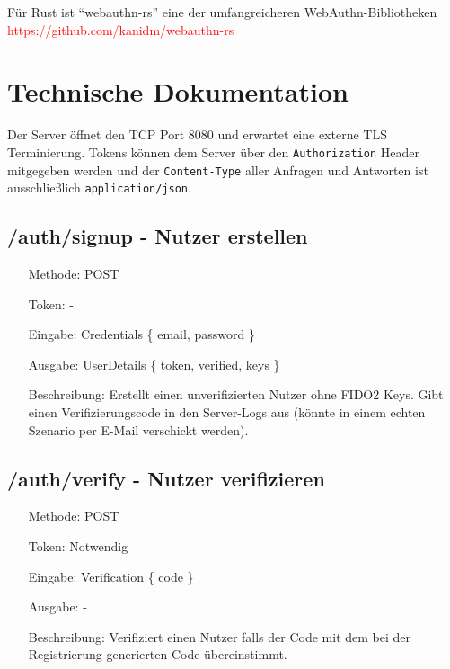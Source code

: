 \documentclass[journal]{IEEEtran}
\begin{document}
Für Rust ist ``webauthn-rs'' eine der umfangreicheren WebAuthn-Bibliotheken 
\textcolor{red}{https://github.com/kanidm/webauthn-rs}

\section{Technische Dokumentation}

Der Server öffnet den TCP Port 8080 und erwartet eine externe TLS
Terminierung. Tokens können dem Server über den \texttt{Authorization} Header
mitgegeben werden und der \texttt{Content-Type} aller Anfragen und Antworten
ist ausschließlich \texttt{application/json}.

\subsection{/auth/signup - Nutzer erstellen}

\begin{itemize}
	\setlength{\leftskip}{1.5cm}
	\setlength{\itemsep}{0pt}
	\item[Methode:] POST
	\item[Token:] -
	\item[Eingabe:] Credentials \{ email, password \}
	\item[Ausgabe:] UserDetails \{ token, verified, keys \}
	\item[Beschreibung:] Erstellt einen unverifizierten Nutzer ohne FIDO2 Keys.
		Gibt einen Verifizierungscode in den Server-Logs aus (könnte in einem
		echten Szenario per E-Mail verschickt werden).
\end{itemize}

\subsection{/auth/verify - Nutzer verifizieren}

\begin{itemize}
	\setlength{\leftskip}{1.5cm}
	\setlength{\itemsep}{0pt}
	\item[Methode:] POST
	\item[Token:] Notwendig
	\item[Eingabe:] Verification \{ code \}
	\item[Ausgabe:] -
	\item[Beschreibung:] Verifiziert einen Nutzer falls der Code mit dem bei
		der Registrierung generierten Code übereinstimmt.
\end{itemize}
\end{document}
